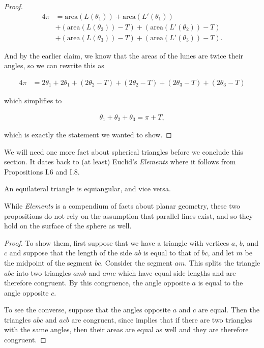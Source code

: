 \begin{proof}
	\begin{align*}
	4\pi &= \mathrm{area}(L(\theta_1)) + \mathrm{area}(L'(\theta_1)) \\
	&+  (\mathrm{area}(L(\theta_2)) - T) + (\mathrm{area}(L'(\theta_2)) - T) \\
	&+ (\mathrm{area}(L(\theta_3)) - T)	 + (\mathrm{area}(L'(\theta_3)) - T).
	\end{align*}
	
	And by the earlier claim, we know that the areas of the lunes are twice their angles, so we can rewrite this as
	
	
	\begin{align*}
	4\pi &= 2\theta_1 + 2\theta_1 
	+  (2\theta_2 - T) + (2\theta_2-T) 
	+ (2\theta_3 - T)	 + (2\theta_3 - T)
	\end{align*}
	
	which simplifies to 
	
	\begin{align*}
	\theta_1+\theta_2+\theta_3 = \pi + T,
	\end{align*}
	
	which is exactly the statement we wanted to show.
\end{proof}

We will need one more fact about spherical triangles before we conclude this section.  It dates back to (at least) Euclid's \textit{Elements} \cite{elements} where it follows from Propositions I.6 and I.8.  

\begin{claim}
	An equilateral triangle is equiangular, and vice versa.
\end{claim}

While \textit{Elements} is a compendium of facts about planar geometry, these two propositions do not rely on the assumption that parallel lines exist, and so they hold on the surface of the sphere as well.  
\begin{proof}
	To show them, first suppose that we have a triangle with vertices $a$, $b$, and $c$ and suppose that the length of the side $ab$ is equal to that of $bc$, and let $m$ be the midpoint of the segment $bc$.  Consider the segment $am$. This splits the triangle $abc$ into two triangles $amb$ and $amc$ which have equal side lengths and are therefore congruent.  By this congruence, the angle opposite $a$ is equal to the angle opposite $c$.
	
	To see the converse, suppose that the angles opposite $a$ and $c$ are equal.  Then the triangles $abc$ and $acb$ are congruent, since  implies that if there are two triangles with the same angles, then their areas are equal as well and they are therefore congruent.
\end{proof}


